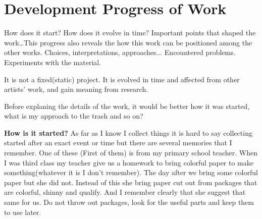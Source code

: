 


%
%
\section{Development Progress of Work}
How does it start? How does it evolve in time? Important points that shaped the work\ldots This progress also reveals the how this work can be positioned among the other works. Choices, interpretations, approaches... Encountered problems. Experiments with the material.

It is not a fixed(static) project. It is evolved in time and affected from other artists' work, and gain meaning from research.

Before explaning the details of the work, it would be better how it was started, what is my approach to the trash and so on?





%
%
\textbf{How is it started?} As far as I know I collect things it is hard to say collecting started after an exact event or time but there are several memories that I remember. One of these (First of them) is from my primary school teacher. When I was third class my teacher give us a homework to bring colorful paper to make something(whatever it is I don't remember). The day after we bring some colorful paper but she did not. Instead of this she bring paper cut out from packages that are colorful, shinny and qualify. And I remember clearly that she suggest that same for us. Do not throw out packages, look for the useful parts and keep them to use later.  







